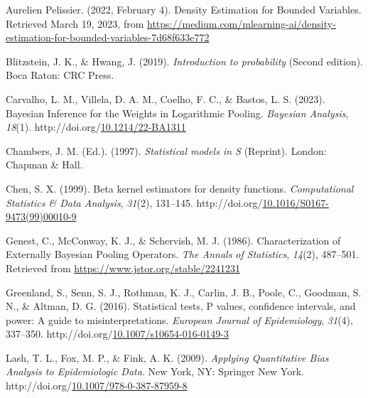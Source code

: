 \documentclass[12pt,twoside]{smiththesis}
\newlength{\cslhangindent}
\newenvironment{CSLReferences}[2] %
 {%
\setlength{\parindent}{0pt}
\ifodd #1 \everypar{\setlength{\hangindent}{\cslhangindent}}\ignorespaces\fi
\ifnum #2 > 0
\setlength{\parskip}{#2\baselineskip}
  \fi
}%
{}
\begin{document}
\hypertarget{refs}{}
\begin{CSLReferences}{1}{0}
\leavevmode{}%
Aurelien Pelissier. (2022, February 4). Density {Estimation} for {Bounded Variables}. Retrieved March 19, 2023, from \url{https://medium.com/mlearning-ai/density-estimation-for-bounded-variables-7d68f633e772}

\leavevmode{}%
Blitzstein, J. K., \& Hwang, J. (2019). \emph{Introduction to probability} (Second edition). {Boca Raton}: {CRC Press}.

\leavevmode{}%
Carvalho, L. M., Villela, D. A. M., Coelho, F. C., \& Bastos, L. S. (2023). Bayesian {Inference} for the {Weights} in {Logarithmic Pooling}. \emph{Bayesian Analysis}, \emph{18}(1). http://doi.org/\href{https://doi.org/10.1214/22-BA1311}{10.1214/22-BA1311}

\leavevmode{}%
Chambers, J. M. (Ed.). (1997). \emph{Statistical models in {S}} (Reprint). {London}: {Chapman \& Hall}.

\leavevmode{}%
Chen, S. X. (1999). Beta kernel estimators for density functions. \emph{Computational Statistics \& Data Analysis}, \emph{31}(2), 131--145. http://doi.org/\href{https://doi.org/10.1016/S0167-9473(99)00010-9}{10.1016/S0167-9473(99)00010-9}

\leavevmode{}%
Genest, C., McConway, K. J., \& Schervish, M. J. (1986). Characterization of {Externally Bayesian Pooling Operators}. \emph{The Annals of Statistics}, \emph{14}(2), 487--501. Retrieved from \url{https://www.jstor.org/stable/2241231}

\leavevmode{}%
Greenland, S., Senn, S. J., Rothman, K. J., Carlin, J. B., Poole, C., Goodman, S. N., \& Altman, D. G. (2016). Statistical tests, {P} values, confidence intervals, and power: A guide to misinterpretations. \emph{European Journal of Epidemiology}, \emph{31}(4), 337--350. http://doi.org/\href{https://doi.org/10.1007/s10654-016-0149-3}{10.1007/s10654-016-0149-3}

\leavevmode{}%
Lash, T. L., Fox, M. P., \& Fink, A. K. (2009). \emph{Applying {Quantitative Bias Analysis} to {Epidemiologic Data}}. {New York, NY}: {Springer New York}. http://doi.org/\href{https://doi.org/10.1007/978-0-387-87959-8}{10.1007/978-0-387-87959-8}


\end{CSLReferences}
\end{document}
